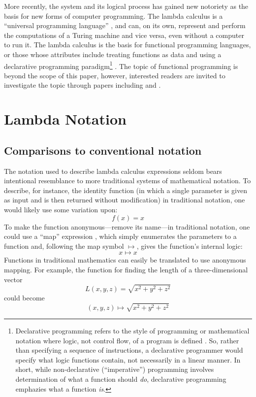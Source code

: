 \documentclass[twocolumn,titlepage,12pt]{article}
\begin{document}
More recently, the system and its logical process has gained new notoriety as the basis for new forms of computer programming. The lambda calculus is a ``universal programming language'' \cite{rojastutorial}, and can, on its own, represent and perform the computations of a Turing machine and vice versa, even without a computer to run it. The lambda calculus is the basis for functional programming languages, or those whose attributes include treating functions as data and using a declarative programming paradigm\footnote{Declarative programming refers to the style of programming or mathematical notation where logic, not control flow, of a program is defined \cite{declarativeprogadv}. So, rather than specifying a sequence of instructions, a declarative programmer would specify what logic functions contain, not necessarily in a linear manner. In short, while non-declarative (``imperative'') programming involves determination of what a function should \textit{do}, declarative programming emphazies what a function \textit{is}.} \cite{hudakevolution}. The topic of functional programming is beyond the scope of this paper, however, interested readers are invited to investigate the topic through papers including \cite{totalfp} and \cite{hudakevolution}.

\section{Lambda Notation}
\subsection{Comparisons to conventional notation}
The notation used to describe lambda calculus expressions seldom bears intentional resemblance to more traditional systems of mathematical notation. To describe, for instance, the identity function (in which a single parameter is given as input and is then returned without modification) in traditional notation, one would likely use some variation upon:
$$f(x)=x$$
To make the function anonymous---remove its name---in traditional notation, one could use a ``map'' expression \cite{intrographtheory}, which simply enumerates the parameters to a function and, following the map symbol $\mapsto$, gives the function's internal logic:
$$x\mapsto x$$
Functions in traditional mathematics can easily be translated to use anonymous mapping. For example, the function for finding the length of a three-dimensional vector
$$L(x,y,z)=\sqrt{x^2+y^2+z^2}$$
could become
$$(x,y,z) \mapsto \sqrt{x^2+y^2+z^2}$$
\end{document}

